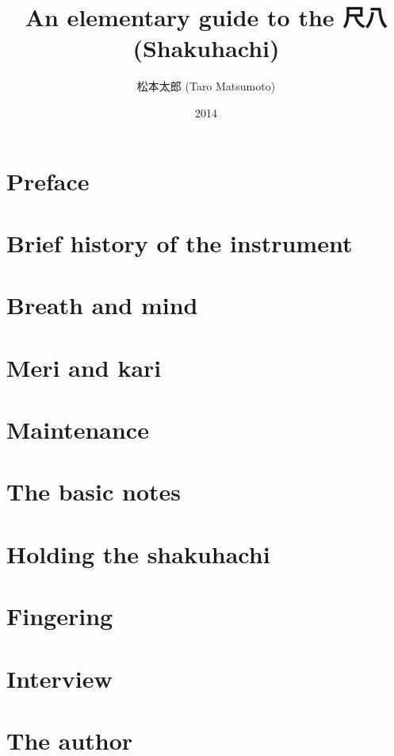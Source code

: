 \documentclass[b5paper]{memoir}
\begin{document}
\frontmatter

\title{\Huge An elementary guide to the 尺八 (Shakuhachi)}
\author{\huge 松本太郎 (Taro Matsumoto)}
\date{\Large 2014}
\maketitle

\cleardoublepage

\tableofcontents
\listoffigures

\cleardoublepage

\section{Preface}


\cleardoublepage

\mainmatter

\section{Brief history of the instrument}


\section{Breath and mind}


\section{Meri and kari}




\enlargethispage{-2.0cm}

\section{Maintenance}


\section{The basic notes}


\section{Holding the shakuhachi}


\appendix
\appendixpage

\section{Fingering}


\section{Interview}

\clearpage

\section{The author}


\backmatter
\end{document}
